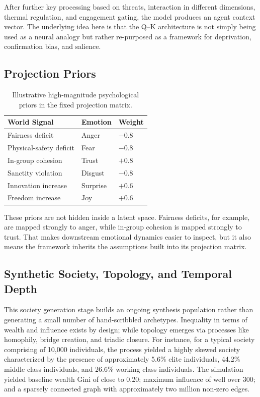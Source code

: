 \documentclass[12pt]{IEEEtran}
\begin{document}
After further key processing based on threats, interaction in different dimensions, thermal regulation, and engagement gating, the model produces an agent context vector. The underlying idea here is that the Q–K architecture is not simply being used as a neural analogy but rather re-purposed as a framework for deprivation, confirmation bias, and salience.

\subsection{Projection Priors}

\begin{table}[t]
\caption{Illustrative high-magnitude psychological priors in the fixed projection matrix.}
\label{tab:priors}
\centering
\begin{tabular}{@{}lll@{}}
\toprule
\textbf{World Signal} & \textbf{Emotion} & \textbf{Weight} \\
\midrule
Fairness deficit & Anger & $-0.8$ \\
Physical-safety deficit & Fear & $-0.8$ \\
In-group cohesion & Trust & $+0.8$ \\
Sanctity violation & Disgust & $-0.8$ \\
Innovation increase & Surprise & $+0.6$ \\
Freedom increase & Joy & $+0.6$ \\
\bottomrule
\end{tabular}
\end{table}

These priors are not hidden inside a latent space. Fairness deficits, for example, are mapped strongly to anger, while in-group cohesion is mapped strongly to trust. That makes downstream emotional dynamics easier to inspect, but it also means the framework inherits the assumptions built into its projection matrix.

\subsection{Synthetic Society, Topology, and Temporal Depth}

This society generation stage builds an ongoing synthesis population rather than generating a small number of hand-scribbled archetypes. Inequality in terms of wealth and influence exists by design; while topology emerges via processes like homophily, bridge creation, and triadic closure. For instance, for a typical society comprising of 10,000 individuals, the process yielded a highly skewed society characterized by the presence of approximately 5.6\% elite individuals, 44.2\% middle class individuals, and 26.6\% working class individuals. The simulation yielded baseline wealth Gini of close to 0.20; maximum influence of well over 300; and a sparsely connected graph with approximately two million non-zero edges.
\end{document}
